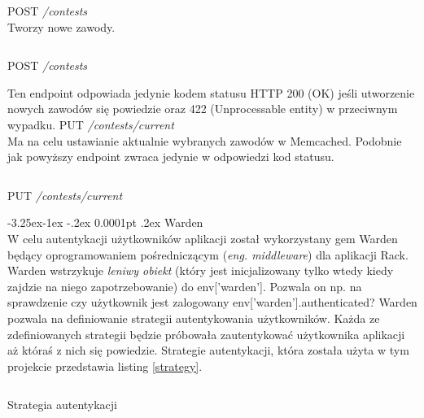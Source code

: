 \documentclass[11pt,a4paper, twoside]{article}
\makeatletter
\renewcommand\paragraph{\@startsection{paragraph}{4}{\z@}%
                                     {-3.25ex\@plus -1ex \@minus -.2ex}%
                                     {0.0001pt \@plus .2ex}%
                                     {\normalfont\normalsize\bfseries}}
\makeatother
\begin{document}
\noindent
POST \emph{/contests}
\\
\noindent
Tworzy nowe zawody.
\begin{listing}[H]
\inputminted{ruby}{./src/contest_curl}
\caption{POST \emph{/contests}}
\end{listing}
\noindent
Ten endpoint odpowiada jedynie kodem statusu HTTP 200 (OK) jeśli utworzenie nowych zawodów się powiedzie oraz 422 (Unprocessable entity) w przeciwnym wypadku.
\newline
\newline
\noindent
PUT \emph{/contests/current}
\\
\noindent
Ma na celu ustawianie aktualnie wybranych zawodów w Memcached. Podobnie jak powyższy endpoint zwraca jedynie w odpowiedzi kod statusu.
\begin{listing}[H]
\inputminted{ruby}{./src/curl_current_contest}
\caption{PUT \emph{/contests/current}}
\end{listing}
\paragraph{Warden}\label{warden} ~\\
W celu autentykacji użytkowników aplikacji został wykorzystany gem Warden będący oprogramowaniem pośredniczącym (\emph{eng. middleware}) dla aplikacji Rack. Warden wstrzykuje \emph{leniwy obiekt} (który jest inicjalizowany tylko wtedy kiedy zajdzie na niego zapotrzebowanie) do env['warden']. Pozwala on np. na sprawdzenie czy użytkownik jest zalogowany env['warden'].authenticated? Warden pozwala na definiowanie strategii autentykowania użytkowników. Każda ze zdefiniowanych strategii będzie próbowała zautentykować użytkownika aplikacji aż któraś z nich się powiedzie. Strategie autentykacji, która została użyta w tym projekcie przedstawia listing \ref{strategy}.

\begin{listing}[H]
\inputminted[linenos=true]{ruby}{./src/warden_strategy.rb}
\caption{Strategia autentykacji}
$\label{strategy}$
\end{listing}
\newpage
\end{document}
